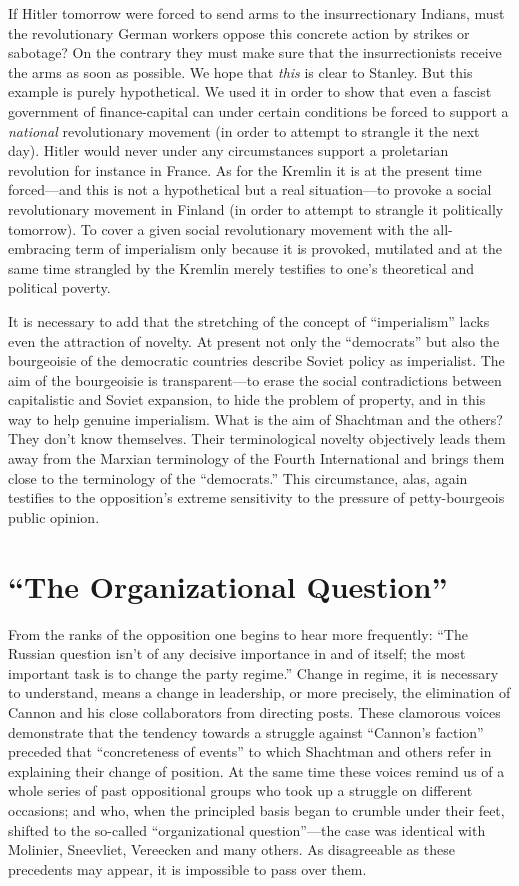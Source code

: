 If Hitler tomorrow were forced to send arms to the insurrectionary Indians, must the revolutionary German workers oppose this concrete action by strikes or sabotage? On the contrary they must make sure that the insurrectionists receive the arms as soon as possible. We hope that \emph{this} is clear to Stanley. But this example is purely hypothetical. We used it in order to show that even a fascist government of finance-capital can under certain conditions be forced to support a \emph{national} revolutionary movement (in order to attempt to strangle it the next day). Hitler would never under any circumstances support a proletarian revolution for instance in France. As for the Kremlin it is at the present time forced---and this is not a hypothetical but a real situation---to provoke a social revolutionary movement in Finland (in order to attempt to strangle it politically tomorrow). To cover a given social revolutionary movement with the all-embracing term of imperialism only because it is provoked, mutilated and at the same time strangled by the Kremlin merely testifies to one’s theoretical and political poverty.

\enlargethispage{-2 \baselineskip}

It is necessary to add that the stretching of the concept of “imperialism” lacks even the attraction of novelty. At present not only the “democrats” but also the bourgeoisie of the democratic countries describe Soviet policy as imperialist. The aim of the bourgeoisie is transparent---to erase the social contradictions between capitalistic and Soviet expansion, to hide the problem of property, and in this way to help genuine imperialism. What is the aim of Shachtman and the others? They don’t know themselves. Their terminological novelty objectively leads them away from the Marxian terminology of the Fourth International and brings them close to the terminology of the “democrats.” This circumstance, alas, again testifies to the opposition’s extreme sensitivity to the pressure of petty-bourgeois public opinion.

\section*{“The Organizational Question”}

From the ranks of the opposition one begins to hear more frequently: “The Russian question isn’t of any decisive importance in and of itself; the most important task is to change the party regime.” Change in regime, it is necessary to understand, means a change in leadership, or more precisely, the elimination of Cannon and his close collaborators from directing posts. These clamorous voices demonstrate that the tendency towards a struggle against “Cannon’s faction” preceded that “concreteness of events” to which Shachtman and others refer in explaining their change of position. At the same time these voices remind us of a whole series of past oppositional groups who took up a struggle on different occasions; and who, when the principled basis began to crumble under their feet, shifted to the so-called “organizational question”---the case was identical with Molinier, Sneevliet, Vereecken and many others. As disagreeable as these precedents may appear, it is impossible to pass over them.

